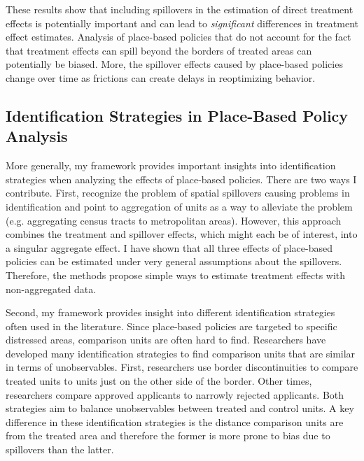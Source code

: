 \documentclass[11pt]{article}
\begin{document}
These results show that including spillovers in the estimation of direct treatment effects is potentially important and can lead to \emph{significant} differences in treatment effect estimates. Analysis of place-based policies that do not account for the fact that treatment effects can spill beyond the borders of treated areas can potentially be biased. More, the spillover effects caused by place-based policies change over time as frictions can create delays in reoptimizing behavior. 

\subsection{Identification Strategies in Place-Based Policy Analysis}\label{sec:pbp}

More generally, my framework provides important insights into identification strategies when analyzing the effects of place-based policies. There are two ways I contribute. First, \citet{Baum-Snow_Ferreira_2015} recognize the problem of spatial spillovers causing problems in identification and point to aggregation of units as a way to alleviate the problem (e.g. aggregating census tracts to metropolitan areas). However, this approach combines the treatment and spillover effects, which might each be of interest, into a singular aggregate effect. I have shown that all three effects of place-based policies can be estimated under very general assumptions about the spillovers. Therefore, the methods propose simple ways to estimate treatment effects with non-aggregated data.

Second, my framework provides insight into different identification strategies often used in the literature. Since place-based policies are targeted to specific distressed areas, comparison units are often hard to find. Researchers have developed many identification strategies to find comparison units that are similar in terms of unobservables. First, researchers use border discontinuities to compare treated units to units just on the other side of the border. Other times, researchers compare approved applicants to narrowly rejected applicants. Both strategies aim to balance unobservables between treated and control units. A key difference in these identification strategies is the distance comparison units are from the treated area and therefore the former is more prone to bias due to spillovers than the latter.
\end{document}
